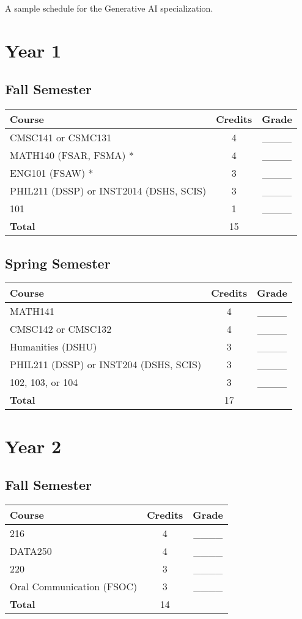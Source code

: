 
A sample schedule for the Generative AI specialization.

\section*{Year 1}
\subsection*{Fall Semester}
\begin{tabular}{|l|c|c|}
    \hline
    Course & Credits & Grade \\
    \hline
    CMSC141 or CSMC131 & 4 & \_\_\_\_ \\
    MATH140 (FSAR, FSMA) * & 4 & \_\_\_\_ \\
    ENG101 (FSAW) * & 3 & \_\_\_\_ \\
    PHIL211 (DSSP) or INST2014 (DSHS, SCIS) & 3 &  \_\_\_\_ \\
    \prefix{}101 & 1 & \_\_\_\_ \\
    \hline
    \textbf{Total} & 15 & \\
    \hline
\end{tabular}

\subsection*{Spring Semester}
\begin{tabular}{|l|c|c|}
    \hline
    Course & Credits & Grade \\
    \hline
    MATH141 & 4 & \_\_\_\_ \\
    CMSC142 or CMSC132 & 4 & \_\_\_\_ \\
    Humanities (DSHU) & 3 & \_\_\_\_ \\
    PHIL211 (DSSP) or INST204 (DSHS, SCIS) & 3 & \_\_\_\_ \\
    \prefix{}102, 103, or 104 & 3 & \_\_\_\_ \\ 
    \hline
    \textbf{Total} & 17 & \\
    \hline
\end{tabular}

\section*{Year 2}
\subsection*{Fall Semester}
\begin{tabular}{|l|c|c|}
    \hline
    Course & Credits & Grade \\
    \hline
    \prefix{}216 & 4 & \_\_\_\_ \\
    DATA250 & 4 & \_\_\_\_ \\
    \prefix{}220 & 3 & \_\_\_\_ \\
    Oral Communication (FSOC) & 3 & \_\_\_\_ \\
    \hline
    \textbf{Total} & 14 & \\
    \hline
\end{tabular}

